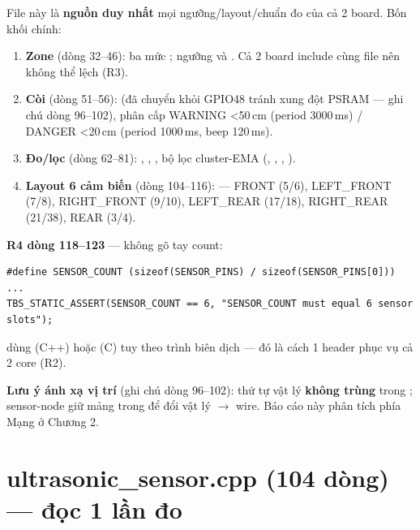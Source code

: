 File này là \textbf{nguồn duy nhất} mọi ngưỡng/layout/chuẩn đo của cả 2 board.
Bốn khối chính:

\begin{enumerate}
\item \textbf{Zone} (dòng 32--46):  ba mức
; ngưỡng  và
. Cả 2 board include cùng file nên không thể lệch
(R3).
\item \textbf{Còi} (dòng 51--56):  (đã chuyển khỏi GPIO48
tránh xung đột PSRAM — ghi chú dòng 96--102), phân cấp WARNING \textless{}50\,cm
(period 3000\,ms) / DANGER \textless{}20\,cm (period 1000\,ms, beep 120\,ms).
\item \textbf{Đo/lọc} (dòng 62--81): ,
, , bộ lọc
cluster-EMA (, ,
, ).
\item \textbf{Layout 6 cảm biến} (dòng 104--116):  — FRONT (5/6),
LEFT\_FRONT (7/8), RIGHT\_FRONT (9/10), LEFT\_REAR (17/18), RIGHT\_REAR
(21/38), REAR (3/4).
\end{enumerate}

\textbf{R4 dòng 118--123} — không gõ tay count:
\begin{verbatim}
#define SENSOR_COUNT (sizeof(SENSOR_PINS) / sizeof(SENSOR_PINS[0]))
...
TBS_STATIC_ASSERT(SENSOR_COUNT == 6, "SENSOR_COUNT must equal 6 sensor slots");
\end{verbatim}
 dùng  (C++) hoặc
 (C) tuy theo trình biên dịch — đó là cách 1 header
phục vụ cả 2 core (R2).

\textbf{Lưu ý ánh xạ vị trí} (ghi chú dòng 96--102): thứ tự vật lý
 \textbf{không trùng}  trong
; sensor-node giữ mảng 
trong  để đổi vật lý $\rightarrow$ wire. Báo cáo này phân tích
phía Mạng ở Chương 2.

\section{ultrasonic\_sensor.cpp (104 dòng) — đọc 1 lần đo}

